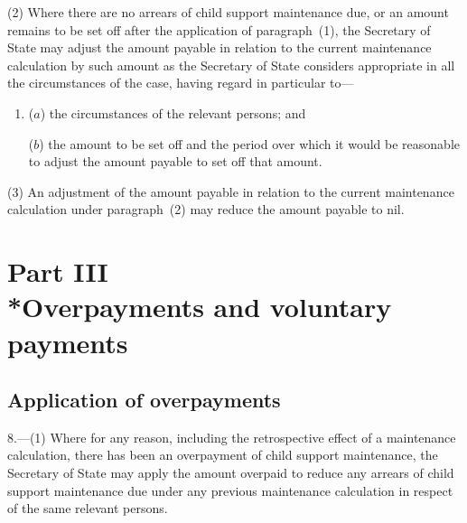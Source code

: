 \documentclass[12pt,a4paper]{article}
\begin{document}
(2) Where there are no arrears of child support maintenance due, or an amount remains to be set off after the application of paragraph~(1), the 
Secretary of State  %
may adjust the amount payable in relation to the current maintenance calculation by such amount as 
the Secretary of State  %
considers appropriate in all the circumstances of the case, having regard in particular to—
\begin{enumerate}\item[]
($a$) the circumstances of the relevant persons; and

($b$) the amount to be set off and the period over which it would be reasonable to adjust the amount payable to set off that amount.
\end{enumerate}

(3) An adjustment of the amount payable in relation to the current maintenance calculation under paragraph~(2) may reduce the amount payable to nil.


\section[Part III --- Overpayments and voluntary payments]{Part III\\*Overpayments and voluntary payments}

\renewcommand\parthead{--- Part III}

\subsection[8. Application of overpayments]{Application of overpayments}

8.---(1)  Where for any reason, including the retrospective effect of a maintenance calculation, there has been an overpayment of child support maintenance, the 
Secretary of State  %
may apply the amount overpaid to reduce any arrears of child support maintenance due under any previous maintenance calculation in respect of the same relevant persons.
\end{document}
